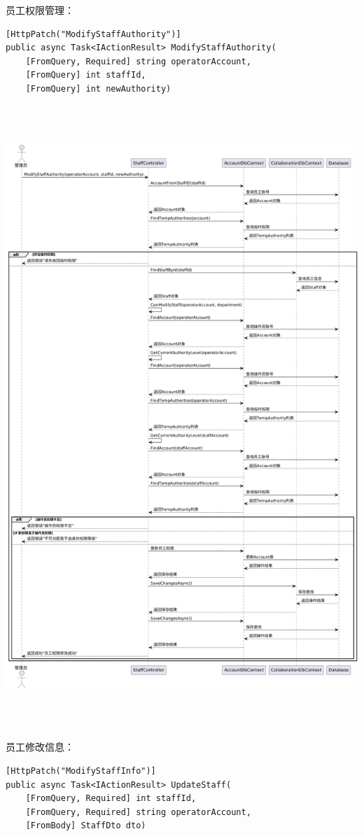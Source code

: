 \documentclass[]{article}
\let\oldincludegraphics\includegraphics
\renewcommand{\includegraphics}[2][]{%
  \begin{center}\oldincludegraphics[#1]{#2}\end{center}%
}
\begin{document}
员工权限管理：
\begin{verbatim}
[HttpPatch("ModifyStaffAuthority")]
public async Task<IActionResult> ModifyStaffAuthority(
    [FromQuery, Required] string operatorAccount,
    [FromQuery] int staffId,
    [FromQuery] int newAuthority)
\end{verbatim}

\includegraphics[width=5.98403in,height=9.26389in]{media/media/image16.png}

员工修改信息：
\begin{verbatim}
[HttpPatch("ModifyStaffInfo")]
public async Task<IActionResult> UpdateStaff(
    [FromQuery, Required] int staffId,
    [FromQuery, Required] string operatorAccount,
    [FromBody] StaffDto dto)
\end{verbatim}
\end{document}

